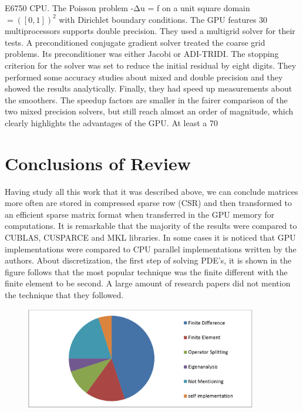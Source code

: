 E6750 CPU. The Poisson problem -Δu = f on a unit square domain  $= ([0,1])^2$ with Dirichlet boundary conditions. The GPU features 30 multiprocessors supports double precision. They used a multigrid solver for their tests. A preconditioned conjugate gradient solver treated the coarse grid problems. Its preconditioner was either Jacobi or ADI-TRIDI. The stopping criterion for the solver was set to reduce the initial residual by eight digits. They performed some accuracy studies about mixed and double precision and they showed the results analytically. Finally, they had speed up measurements about the smoothers. The speedup factors are smaller in the fairer comparison of the two mixed precision solvers, but still reach almost an order of magnitude, which clearly highlights the advantages of the GPU. At least a 70%




\section{Conclusions of Review}

Having study all this work that it was described above, we can conclude matrices more often are stored in compressed sparse row (CSR) and then transformed to an efficient sparse matrix format when transferred in the GPU memory for computations.
It is remarkable that the majority of the results were compared to CUBLAS, CUSPARCE and MKL libraries. In some cases it is noticed that GPU implementations were compared to CPU parallel implementations written by the authors.
About discretization, the first step of solving PDE’s, it is shown in the figure follows that the most popular technique was the finite different with the finite element to be second. A large amount of research papers did not mention the technique that they followed.

 \begin{figure}[H]
    \centering
        \includegraphics[totalheight=0.4\textheight,width=0.9\textwidth]{review_conclusion.png}
    \caption{}
    \label{fig:warp_scheduler}
\end{figure}

